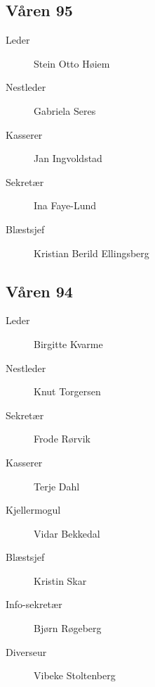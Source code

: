 {\begin{minipage}{0.6\textwidth}
\subsection*{Våren 95}

\begin{description}
	\item[Leder] Stein Otto Høiem
	\item[Nestleder] Gabriela Seres
	\item[Kasserer] Jan Ingvoldstad
	\item[Sekretær] Ina Faye-Lund
	\item[Blæstsjef] Kristian Berild Ellingsberg
\end{description}
\subsection*{Våren 94}

\begin{description}
	\item[Leder] Birgitte Kvarme
	\item[Nestleder] Knut Torgersen
	\item[Sekretær] Frode Rørvik
	\item[Kasserer] Terje Dahl
	\item[Kjellermogul] Vidar Bekkedal
	\item[Blæstsjef] Kristin Skar
	\item[Info-sekretær] Bjørn Røgeberg
	\item[Diverseur] Vibeke Stoltenberg
\end{description}
\end{minipage}
}
